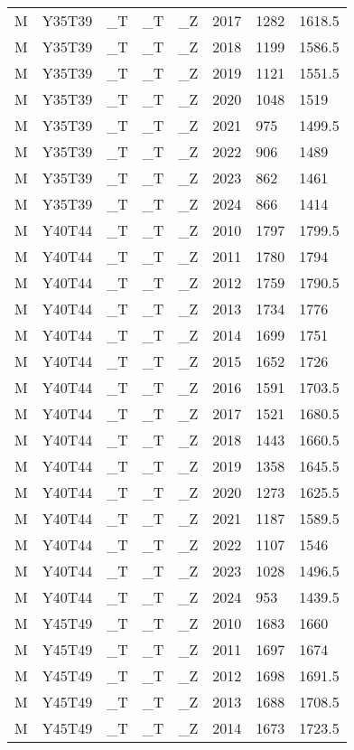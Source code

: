 \begin{longtable}[t]{llllllll}
M & Y35T39 & \_T & \_T & \_Z & 2017 & 1282 & 1618.5\\
M & Y35T39 & \_T & \_T & \_Z & 2018 & 1199 & 1586.5\\
M & Y35T39 & \_T & \_T & \_Z & 2019 & 1121 & 1551.5\\
\addlinespace
M & Y35T39 & \_T & \_T & \_Z & 2020 & 1048 & 1519\\
M & Y35T39 & \_T & \_T & \_Z & 2021 & 975 & 1499.5\\
M & Y35T39 & \_T & \_T & \_Z & 2022 & 906 & 1489\\
M & Y35T39 & \_T & \_T & \_Z & 2023 & 862 & 1461\\
M & Y35T39 & \_T & \_T & \_Z & 2024 & 866 & 1414\\
\addlinespace
M & Y40T44 & \_T & \_T & \_Z & 2010 & 1797 & 1799.5\\
M & Y40T44 & \_T & \_T & \_Z & 2011 & 1780 & 1794\\
M & Y40T44 & \_T & \_T & \_Z & 2012 & 1759 & 1790.5\\
M & Y40T44 & \_T & \_T & \_Z & 2013 & 1734 & 1776\\
M & Y40T44 & \_T & \_T & \_Z & 2014 & 1699 & 1751\\
\addlinespace
M & Y40T44 & \_T & \_T & \_Z & 2015 & 1652 & 1726\\
M & Y40T44 & \_T & \_T & \_Z & 2016 & 1591 & 1703.5\\
M & Y40T44 & \_T & \_T & \_Z & 2017 & 1521 & 1680.5\\
M & Y40T44 & \_T & \_T & \_Z & 2018 & 1443 & 1660.5\\
M & Y40T44 & \_T & \_T & \_Z & 2019 & 1358 & 1645.5\\
\addlinespace
M & Y40T44 & \_T & \_T & \_Z & 2020 & 1273 & 1625.5\\
M & Y40T44 & \_T & \_T & \_Z & 2021 & 1187 & 1589.5\\
M & Y40T44 & \_T & \_T & \_Z & 2022 & 1107 & 1546\\
M & Y40T44 & \_T & \_T & \_Z & 2023 & 1028 & 1496.5\\
M & Y40T44 & \_T & \_T & \_Z & 2024 & 953 & 1439.5\\
\addlinespace
M & Y45T49 & \_T & \_T & \_Z & 2010 & 1683 & 1660\\
M & Y45T49 & \_T & \_T & \_Z & 2011 & 1697 & 1674\\
M & Y45T49 & \_T & \_T & \_Z & 2012 & 1698 & 1691.5\\
M & Y45T49 & \_T & \_T & \_Z & 2013 & 1688 & 1708.5\\
M & Y45T49 & \_T & \_T & \_Z & 2014 & 1673 & 1723.5\\

\end{longtable}
